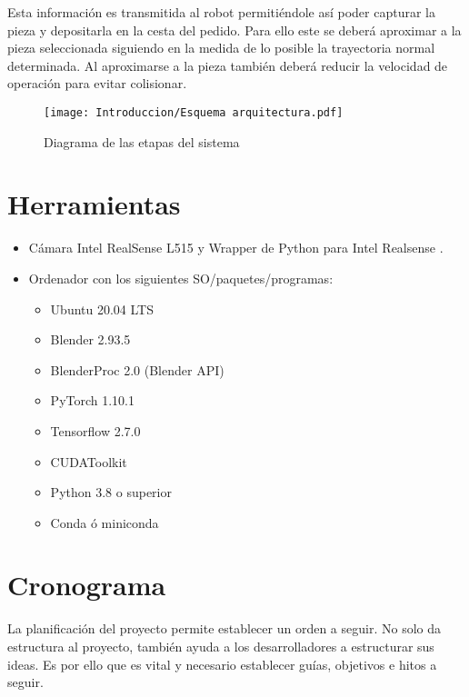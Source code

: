 Esta información es transmitida al robot permitiéndole así poder capturar la pieza y depositarla en la cesta del pedido. Para ello este se deberá aproximar a la pieza seleccionada siguiendo en la medida de lo posible la trayectoria normal determinada. Al aproximarse a la pieza también deberá reducir la velocidad de operación para evitar colisionar.

\begin{figure}[ht]
	\centering
	\texttt{[image: Introduccion/Esquema arquitectura.pdf]}
	\caption{Diagrama de las etapas del sistema}
	\label{chap:Introducción fig:Arq2}
	\vspace{-5pt}
\end{figure}

\section{Herramientas}
\label{chap:Introduccion sec:Herramientas}
\begin{itemize}
	\item Cámara Intel RealSense L515 \cite{IntelL515} y Wrapper de Python para Intel Realsense \cite{SDK}.
	\item Ordenador con los siguientes SO/paquetes/programas:
		\begin{itemize}
			\item Ubuntu 20.04 LTS
			\item Blender 2.93.5
			\item BlenderProc 2.0 (Blender API)
			\item PyTorch 1.10.1
			\item Tensorflow 2.7.0
			\item CUDAToolkit
			\item Python 3.8 o superior
			\item Conda ó miniconda
		\end{itemize}
\end{itemize}

\section{Cronograma}
\label{chap:Introducción sec:Cronograma}
La planificación del proyecto permite establecer un orden a seguir. No solo da estructura al proyecto, también ayuda a los desarrolladores a estructurar sus ideas. Es por ello que es vital y necesario establecer guías, objetivos e hitos a seguir.

